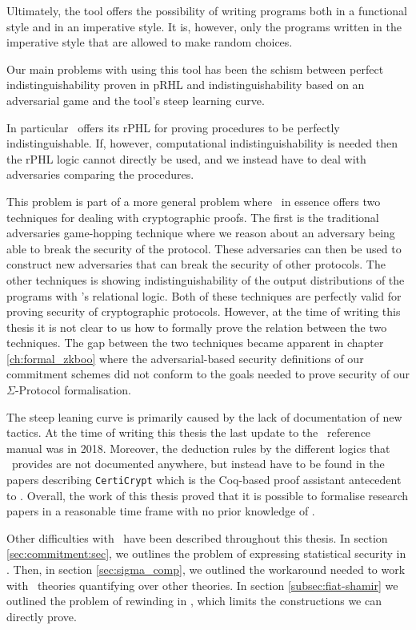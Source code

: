 Ultimately, the tool offers the possibility of writing programs both in a
functional style and in an imperative style. It is, however, only the programs
written in the imperative style that are allowed to make random choices.

Our main problems with using this tool has been the schism between perfect
indistinguishability proven in pRHL and indistinguishability based on an
adversarial game and the tool's steep learning curve.

In particular \easycrypt\ offers its rPHL for proving procedures to be perfectly
indistinguishable. If, however, computational indistinguishability is needed then
the rPHL logic cannot directly be used, and we instead have to deal with
adversaries comparing the procedures.

This problem is part of a more general problem where \easycrypt\ in essence
offers two techniques for dealing with cryptographic proofs. The first is the
traditional adversaries game-hopping technique where we reason about an
adversary being able to break the security of the protocol. These adversaries can
then be used to construct new adversaries that can break the security of other protocols.
The other techniques is showing indistinguishability of the output distributions
of the programs with \easycrypt's relational logic.
Both of these techniques are perfectly valid for proving security of
cryptographic protocols.
However, at the time of writing this thesis it is not
clear to us how to formally prove the relation between the two techniques.
The gap between the two techniques became apparent in chapter \ref{ch:formal_zkboo} where the
adversarial-based security definitions of our commitment schemes did not conform
to the goals needed to prove security of our $\Sigma$-Protocol formalisation.

The steep leaning curve is primarily caused by the lack of documentation of new
tactics. At the time of writing this thesis the last update to the \easycrypt\
reference manual \cite{ec_refman} was in 2018. Moreover, the deduction rules by
the different logics that \easycrypt\ provides are not documented anywhere, but
instead have to be found in the papers describing \texttt{CertiCrypt} which is
the Coq-based proof assistant antecedent to \easycrypt.
Overall, the work of this thesis proved that it is possible to formalise research papers in a
reasonable time frame with no prior knowledge of \easycrypt.

Other difficulties with \easycrypt\ have been described throughout this thesis.
In section \ref{sec:commitment:sec}, we outlines the problem of expressing
statistical security in \easycrypt. Then, in section \ref{sec:sigma_comp}, we
outlined the workaround needed to work with \easycrypt\ theories quantifying
over other theories. In section \ref{subsec:fiat-shamir} we outlined the problem
of rewinding in \easycrypt, which limits the constructions we can directly prove.

